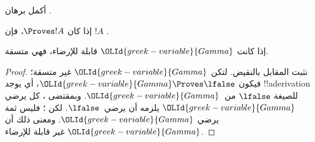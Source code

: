 \documentclass[../../../include/open-logic-section]{subfiles}
\begin{document}
\begin{prob}
  أكمل برهان .
\end{prob}
\tagendprob

\begin{cor}
إذا كان $\Proves !A$، فإن $!A$ .
\end{cor}

\begin{cor}
إذا كانت ${\OLId{greek-variable}{Gamma}}$ قابلة للإرضاء، فهي متسقة.
\end{cor}

\begin{proof}
نثبت المقابل بالنقيض. لتكن ${\OLId{greek-variable}{Gamma}}$ غير متسقة؛ فيكون
${\OLId{greek-variable}{Gamma}} \Proves \lfalse$، أي يوجد !!a{derivation} للصيغة
$\lfalse$ من~${\OLId{greek-variable}{Gamma}}$. وبمقتضى ، كل
يرضي ${\OLId{greek-variable}{Gamma}}$ يلزمه أن يرضي~$\lfalse$. لكن
؛ فليس ثمة
 يرضي ${\OLId{greek-variable}{Gamma}}$. ومعنى ذلك أن
${\OLId{greek-variable}{Gamma}}$ غير قابلة للإرضاء.
\end{proof}
\end{document}
